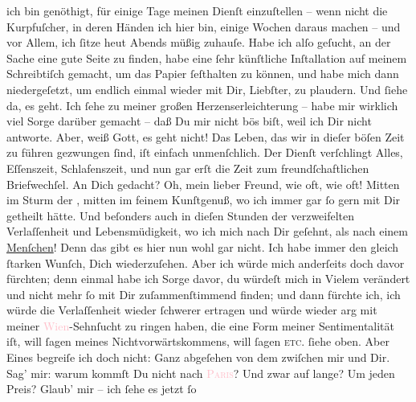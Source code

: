                ich bin genöthigt, für einige Tage meinen Dienſt einzuſtellen – wenn nicht die
               Kurpfuſcher, in deren Händen ich hier bin, einige Wochen daraus machen – und vor
               Allem, ich ſitze heut{ }Abends müßig zuhauſe. Habe ich alſo geſucht, an der Sache eine gute
               Seite zu finden, habe eine ſehr künſtliche Inſtallation auf meinem Schreibtiſch
               gemacht, um das Papier ſeſthalten zu können, und habe mich dann niedergeſetzt, um {\pb}endlich einmal wieder mit Dir, Liebſter, zu plaudern.
               Und ſiehe da, es geht.\pend
           \pstart
           Ich ſehe zu meiner großen Herzenserleichterung – habe mir wirklich viel Sorge darüber
               gemacht – daß Du mir nicht bös biſt, weil ich Dir nicht antworte. Aber, weiß Gott, es
               geht nicht! Das Leben, das wir in dieſer böſen Zeit zu führen gezwungen ſind, iſt
               einfach unmenſchlich. Der Dienſt verſchlingt Alles, Eſſenszeit, Schlafenszeit, und
               nun gar erſt die {\pb}Zeit zum freundſchaftlichen
               Briefwechſel. An Dich gedacht? Oh, mein lieber Freund, wie oft, wie oft! Mitten im
               Sturm der \label{T_L02704-1v}\label{T_L02704-1h}, mitten im feinem Kunſtgenuß, wo ich immer gar
               ſo gern mit Dir getheilt hätte. Und beſonders auch in dieſen Stunden der
               verzweifelten Verlaſſenheit und Lebensmüdigkeit, wo ich mich nach Dir geſehnt, als
               nach einem \uline{Menſchen}! Denn das gibt es hier nun wohl
               gar nicht. Ich habe immer den gleich ſtarken Wunſch, Dich {\pb}wiederzuſehen. Aber ich würde mich anderſeits doch
               davor fürchten; denn einmal habe ich Sorge davor, du würdeſt mich in Vielem verändert
               und nicht mehr ſo mit Dir zuſammenſtimmend finden; und dann fürchte ich, ich würde
               die Verlaſſenheit wieder ſchwerer ertragen und würde wieder arg mit meiner \textcolor{pink}{Wien}{}\ledrightnote{\textcolor{pink}{Paris}}-Sehnſucht zu ringen haben, die eine Form
               meiner Sentimentalität iſt, will ſagen meines Nichtvorwärtskommens, will ſagen \textsc{etc.} ſiehe oben. {\pb}Aber
               Eines begreiſe ich doch nicht: Ganz abgeſehen von dem zwiſchen mir und Dir. Sag’ mir:
               warum kommſt Du nicht nach \textsc{\textcolor{pink}{Paris}{}\ledrightnote{\textcolor{pink}{Paris}}}? Und zwar auf lange? Um jeden Preis? Glaub’ mir – ich ſehe es jetzt ſo
